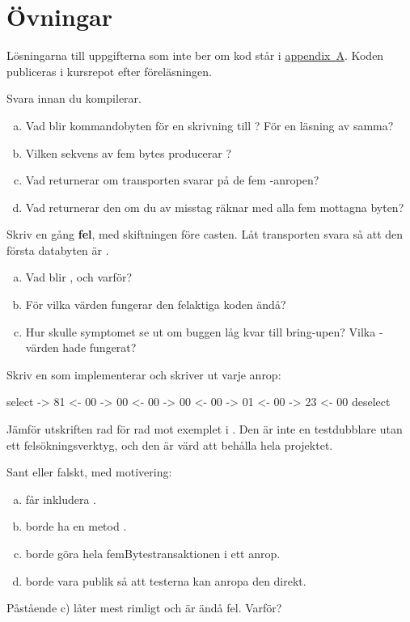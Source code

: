\section*{Övningar}

Lösningarna till uppgifterna som inte ber om kod står i \hyperref[ch:losningar]{appendix~A}.
Koden publiceras i kursrepot efter föreläsningen.

\label{ex:9:1}
Svara innan du kompilerar.
\begin{enumerate}[a)]
  \item Vad blir kommandobyten för en skrivning till ? För en läsning av samma?
  \item Vilken sekvens av fem bytes producerar ?
  \item Vad returnerar  om transporten svarar  på de fem
    -anropen?
  \item Vad returnerar den om du av misstag räknar med alla fem mottagna byten?
\end{enumerate}

\label{ex:9:2}
Skriv  en gång \textbf{fel}, med skiftningen före casten. Låt transporten svara så
att den första databyten är .
\begin{enumerate}[a)]
  \item Vad blir , och varför?
  \item För vilka värden fungerar den felaktiga koden ändå?
  \item Hur skulle symptomet se ut om buggen låg kvar till bring-upen? Vilka -värden hade
    fungerat?
\end{enumerate}

\label{ex:9:3}
Skriv en  som implementerar  och skriver ut varje anrop:
\begin{console}
select
  -> 81   <- 00
  -> 00   <- 00
  -> 00   <- 00
  -> 01   <- 00
  -> 23   <- 00
deselect
\end{console}
Jämför utskriften rad för rad mot exemplet i . Den är inte en testdubblare utan ett
felsökningsverktyg, och den är värd att behålla hela projektet.

\label{ex:9:4}
Sant eller falskt, med motivering:
\begin{enumerate}[a)]
  \item {} får inkludera .
  \item {} borde ha en metod .
  \item {} borde göra hela femBytestransaktionen i ett anrop.
  \item {} borde vara publik så att testerna kan anropa den direkt.
\end{enumerate}
Påstående c) låter mest rimligt och är ändå fel. Varför?
